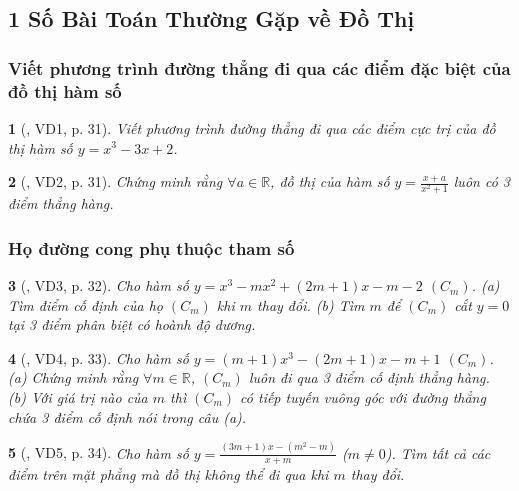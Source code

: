 \documentclass{article}
\newtheorem{baitoan}{}
\begin{document}

\subsection{1 Số Bài Toán Thường Gặp về Đồ Thị}

\subsubsection{Viết phương trình đường thẳng đi qua các điểm đặc biệt của đồ thị hàm số}

\begin{baitoan}[\cite{TLCT_giai_tich_12}, VD1, p. 31]
	Viết phương trình đường thẳng đi qua các điểm cực trị của đồ thị hàm số $y = x^3 - 3x + 2$.
\end{baitoan}

\begin{baitoan}[\cite{TLCT_giai_tich_12}, VD2, p. 31]
	Chứng minh rằng $\forall a\in\mathbb{R}$, đồ thị của hàm số $y = \frac{x + a}{x^2 + 1}$ luôn có 3 điểm thẳng hàng.
\end{baitoan}

\subsubsection{Họ đường cong phụ thuộc tham số}

\begin{baitoan}[\cite{TLCT_giai_tich_12}, VD3, p. 32]
	Cho hàm số $y = x^3 - mx^2 + (2m + 1)x - m - 2$ $(C_m)$. (a) Tìm điểm cố định của họ $(C_m)$ khi $m$ thay đổi. (b) Tìm $m$ để $(C_m)$ cắt $y = 0$ tại 3 điểm phân biệt có hoành độ dương.	
\end{baitoan}

\begin{baitoan}[\cite{TLCT_giai_tich_12}, VD4, p. 33]
	Cho hàm số $y = (m + 1)x^3 - (2m + 1)x - m + 1$ $(C_m)$. (a) Chứng minh rằng $\forall m\in\mathbb{R}$, $(C_m)$ luôn đi qua 3 điểm cố định thẳng hàng. (b) Với giá trị nào của $m$ thì $(C_m)$ có tiếp tuyến vuông góc với đường thẳng chứa 3 điểm cố định nói trong câu (a).	
\end{baitoan}

\begin{baitoan}[\cite{TLCT_giai_tich_12}, VD5, p. 34]
	Cho hàm số $y = \frac{(3m + 1)x - (m^2 - m)}{x + m}$ ($m\ne 0$). Tìm tất cả các điểm trên mặt phẳng mà đồ thị không thể đi qua khi $m$ thay đổi.
\end{baitoan}
\end{document}
